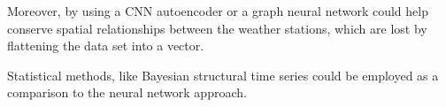 \documentclass[11pt,table]{article}
\begin{document}
Moreover, by using a \ac{CNN} autoencoder or a graph neural network could help conserve spatial relationships between the weather stations, which are lost by flattening the data set into a vector.

Statistical methods, like Bayesian structural time series \cite{scott_predicting_2014,TFProb_Structural_Timeseries} could be employed as a comparison to the neural network approach.


\printbibliography
\end{document}
